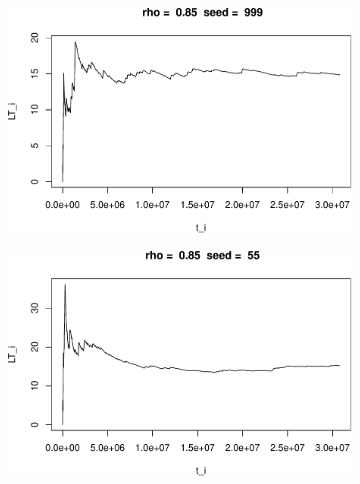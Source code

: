 \documentclass[]{article}
\begin{document}
\begin{figure}[h!]
\begin{subfigure}[b]{.55\linewidth}
\includegraphics[width=\linewidth]{003_files/figure-latex/unnamed-chunk-20-5.pdf}
\end{subfigure}\hfill
\begin{subfigure}[b]{.55\linewidth}
\includegraphics[width=\linewidth]{003_files/figure-latex/unnamed-chunk-20-6.pdf}
\end{subfigure}\vfill
\end{figure}
\end{document}
